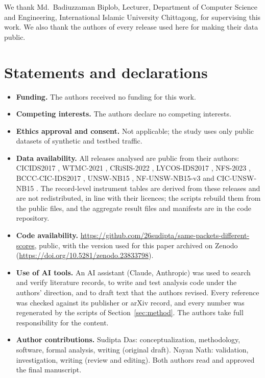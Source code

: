 \documentclass[pdflatex,sn-mathphys-num]{sn-jnl}
\newcommand{\cicids}{CICIDS2017}
\theoremstyle{thmstyleone}%
\theoremstyle{thmstylethree}%
\begin{document}
\backmatter

We thank Md.\ Badiuzzaman Biplob, Lecturer, Department of Computer Science and Engineering, International Islamic University Chittagong, for supervising this work. We also thank the authors of every release used here for making their data public.

\section*{Statements and declarations}\label{sec:declarations}

\begin{itemize}
\item \textbf{Funding.} The authors received no funding for this work.
\item \textbf{Competing interests.} The authors declare no competing interests.
\item \textbf{Ethics approval and consent.} Not applicable; the study uses only public datasets of synthetic and testbed traffic.
\item \textbf{Data availability.} All releases analysed are public from their authors: \cicids{} \cite{sharafaldin2018}, WTMC-2021 \cite{engelen2021}, CRiSIS-2022 \cite{lanvin2023}, LYCOS-IDS2017 \cite{rosay2021}, NFS-2023 \cite{pekar2024}, BCCC-CIC-IDS2017 \cite{shafi2024}, UNSW-NB15 \cite{moustafa2015}, NF-UNSW-NB15-v3 \cite{luay2026} and CIC-UNSW-NB15 \cite{mohammadian2024}. The record-level instrument tables are derived from these releases and are not redistributed, in line with their licences; the scripts rebuild them from the public files, and the aggregate result files and manifests are in the code repository.
\item \textbf{Code availability.} \url{https://github.com/26sudipta/same-packets-different-scores}, public, with the version used for this paper archived on Zenodo (\url{https://doi.org/10.5281/zenodo.23833798}).
\item \textbf{Use of AI tools.} An AI assistant (Claude, Anthropic) was used to search and verify literature records, to write and test analysis code under the authors' direction, and to draft text that the authors revised. Every reference was checked against its publisher or arXiv record, and every number was regenerated by the scripts of Section~\ref{sec:method}. The authors take full responsibility for the content.
\item \textbf{Author contributions.} Sudipta Das: conceptualization, methodology, software, formal analysis, writing (original draft). Nayan Nath: validation, investigation, writing (review and editing). Both authors read and approved the final manuscript.
\end{itemize}

\begin{appendices}

\end{appendices}


\end{document}

